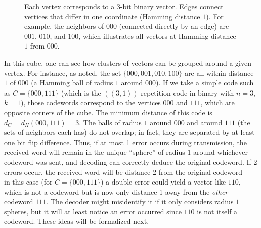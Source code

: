 \documentclass[docmute]{article}
\begin{document}
\begin{figure}[h]
\centering
{}
\caption{Each vertex corresponds to a 3-bit binary vector. Edges connect vertices that differ in one coordinate (Hamming distance $1$). For example, the neighbors of $000$ (connected directly by an edge) are $001$, $010$, and $100$, which illustrates all vectors at Hamming distance $1$ from $000$.}
\end{figure}

In this cube, one can see how clusters of vectors can be grouped around a given vertex. For instance, as noted, the set $\{000,001,010,100\}$ are all within distance $1$ of $000$ (a Hamming ball of radius $1$ around $000$). If we take a simple code such as $C=\{000,111\}$ (which is the $((3,1))$ repetition code in binary with $n=3$, $k=1$), those codewords correspond to the vertices $000$ and $111$, which are opposite corners of the cube. The minimum distance of this code is $d_C = d_H(000,111) = 3$. The balls of radius $1$ around $000$ and around $111$ (the sets of neighbors each has) do not overlap; in fact, they are separated by at least one bit flip difference. Thus, if at most 1 error occurs during transmission, the received word will remain in the unique “sphere” of radius $1$ around whichever codeword was sent, and decoding can correctly deduce the original codeword. If 2 errors occur, the received word will be distance 2 from the original codeword --- in this case (for $C=\{000,111\}$) a double error could yield a vector like $110$, which is not a codeword but is now only distance 1 away from the \emph{other} codeword $111$. The decoder might misidentify it if it only considers radius $1$ spheres, but it will at least notice an error occurred since $110$ is not itself a codeword. These ideas will be formalized next.
\end{document}
